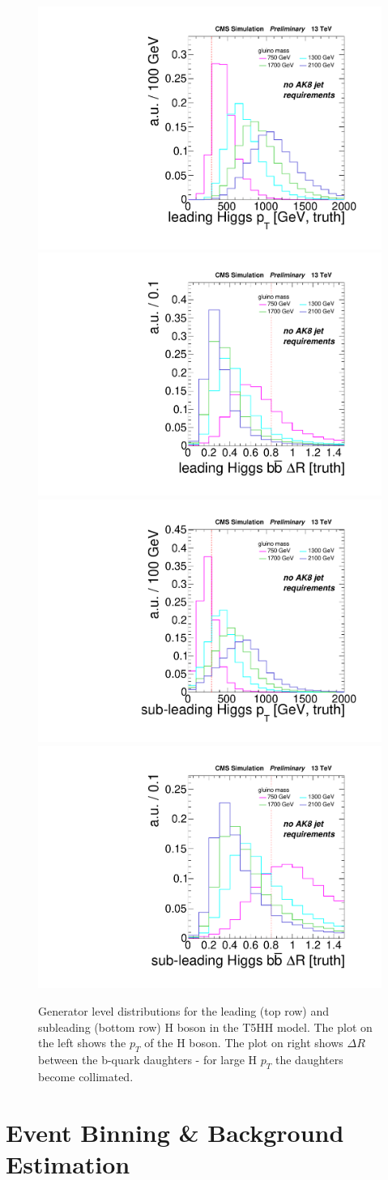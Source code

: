 \begin{figure}[hb!]
\centering
\includegraphics[width=0.45\linewidth]{figs/leadHiggsPt.pdf}
\includegraphics[width=0.45\linewidth]{figs/leadHiggsDr.pdf}\\
\includegraphics[width=0.45\linewidth]{figs/subleadHiggsPt.pdf}
\includegraphics[width=0.45\linewidth]{figs/subleadHiggsDr.pdf}\\
\caption{
Generator level distributions for the leading (top row) and subleading (bottom row) H boson in the T5HH model. The plot on the left shows the $p_{T}$ of the H boson. The plot on right shows $\Delta R$ between the b-quark daughters - for large H $p_{T}$ the daughters become collimated.
}
\label{fig:GenHiggsBoost}
\end{figure}

\section{Event Binning \& Background Estimation}

